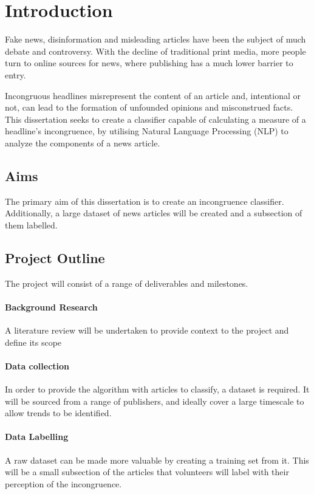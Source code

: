 \section{Introduction}
Fake news, disinformation and misleading articles have been the subject of much debate and controversy. With the decline of traditional print media, more people turn to online sources for news, where publishing has a much lower barrier to entry.

Incongruous headlines misrepresent the content of an article and, intentional or not, can lead to the formation of unfounded opinions and misconstrued facts. This dissertation seeks to create a classifier capable of calculating a measure of a headline's incongruence, by utilising Natural Language Processing (NLP) to analyze the components of a news article.

\subsection{Aims}
The primary aim of this dissertation is to create an incongruence classifier. Additionally, a large dataset of news articles will be created and a subsection of them labelled.


\subsection{Project Outline}
The project will consist of a range of deliverables and milestones.
 
\paragraph{Background Research}
A literature review will be undertaken to provide context to the project and define its scope

\paragraph{Data collection}
In order to provide the algorithm with articles to classify, a dataset is required. It will be sourced from a range of publishers, and ideally cover a large timescale to allow trends to be identified.

\paragraph{Data Labelling}
A raw dataset can be made more valuable by creating a training set from it. This will be a small subsection of the articles that volunteers will label with their perception of the incongruence.

